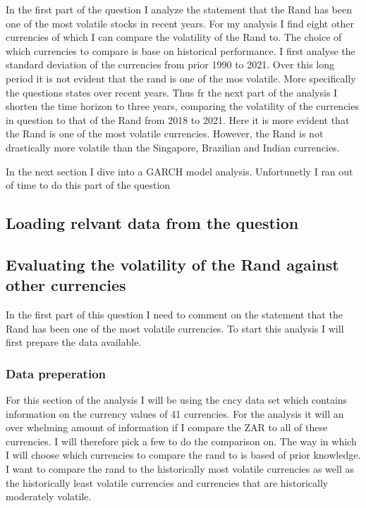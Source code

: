 \documentclass[11pt,preprint, authoryear]{elsarticle}
\numberwithin{equation}{section}
\numberwithin{figure}{section}
\numberwithin{table}{section}
\begin{document}
In the first part of the question I analyze the statement that the Rand
has been one of the most volatile stocks in recent years. For my
analysis I find eight other currencies of which I can compare the
volatility of the Rand to. The choice of which currencies to compare is
base on historical performance. I first analyse the standard deviation
of the currencies from prior 1990 to 2021. Over this long period it is
not evident that the rand is one of the mos volatile. More specifically
the questions states over recent years. Thus fr the next part of the
analysis I shorten the time horizon to three years, comparing the
volatility of the currencies in question to that of the Rand from 2018
to 2021. Here it is more evident that the Rand is one of the most
volatile currencies. However, the Rand is not drastically more volatile
than the Singapore, Brazilian and Indian currencies.

In the next section I dive into a GARCH model analysis. Unfortunetly I
ran out of time to do this part of the question

\hypertarget{loading-relvant-data-from-the-question}{%
\subsection{Loading relvant data from the
question}\label{loading-relvant-data-from-the-question}}

\hypertarget{evaluating-the-volatility-of-the-rand-against-other-currencies}{%
\subsection{Evaluating the volatility of the Rand against other
currencies}\label{evaluating-the-volatility-of-the-rand-against-other-currencies}}

In the first part of this question I need to comment on the statement
that the Rand has been one of the most volatile currencies. To start
this analysis I will first prepare the data available.

\hypertarget{data-preperation}{%
\subsubsection{Data preperation}\label{data-preperation}}

For this section of the analysis I will be using the cncy data set which
contains information on the currency values of 41 currencies. For the
analysis it will an over whelming amount of information if I compare the
ZAR to all of these currencies. I will therefore pick a few to do the
comparison on. The way in which I will choose which currencies to
compare the rand to is based of prior knowledge. I want to compare the
rand to the historically most volatile currencies as well as the
historically least volatile currencies and currencies that are
historically moderately volatile.
\end{document}
